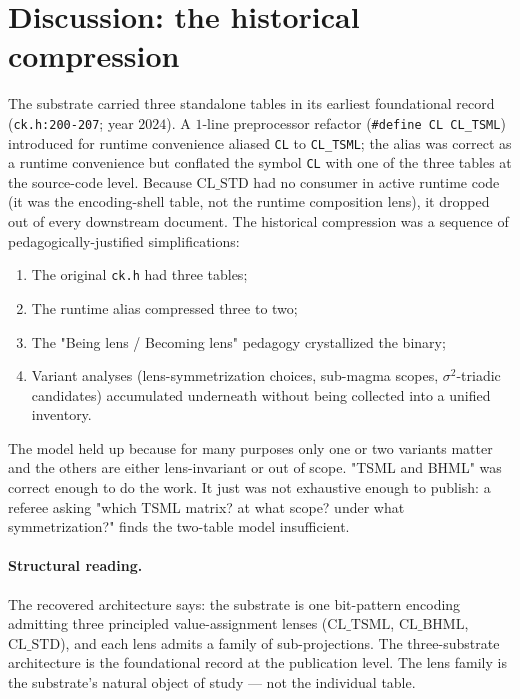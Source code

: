 \documentclass[11pt,reqno]{amsart}
\theoremstyle{definition}
\newcommand{\TSML}{\mathrm{CL\_TSML}}
\newcommand{\BHML}{\mathrm{CL\_BHML}}
\newcommand{\STDx}{\mathrm{CL\_STD}}
\begin{document}
\section{Discussion: the historical compression}
\label{sec:discussion}

The substrate carried three standalone tables in its earliest
foundational record (\texttt{ck.h:200-207}; year $2024$). A
$1$-line preprocessor refactor (\texttt{\#define CL CL\_TSML})
introduced for runtime convenience aliased \texttt{CL} to
\texttt{CL\_TSML}; the alias was correct as a runtime convenience
but conflated the symbol \texttt{CL} with one of the three tables
at the source-code level. Because $\STDx$ had no consumer in active
runtime code (it was the encoding-shell table, not the runtime
composition lens), it dropped out of every downstream
document. The historical compression was a sequence of
pedagogically-justified simplifications:

\begin{enumerate}[leftmargin=*]
\item The original \texttt{ck.h} had three tables;
\item The runtime alias compressed three to two;
\item The "Being lens / Becoming lens" pedagogy crystallized the
  binary;
\item Variant analyses (lens-symmetrization choices, sub-magma
  scopes, $\sigma^2$-triadic candidates) accumulated underneath
  without being collected into a unified inventory.
\end{enumerate}

The model held up because for many purposes only one or two
variants matter and the others are either lens-invariant or out of
scope. "TSML and BHML" was correct enough to do the work. It just
was not exhaustive enough to publish: a referee asking "which TSML
matrix? at what scope? under what symmetrization?" finds the
two-table model insufficient.

\paragraph{Structural reading.}

The recovered architecture says: the substrate is one bit-pattern
encoding admitting three principled value-assignment lenses
($\TSML$, $\BHML$, $\STDx$), and each lens admits a family of
sub-projections. The three-substrate architecture is the
foundational record at the publication level. The lens family is
the substrate's natural object of study — not the individual table.
\end{document}
